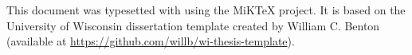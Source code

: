 This document was typesetted with \LaTeXe using the MiKTeX project. It is based on the University of Wisconsin dissertation template created by William C. Benton (available at \url{https://github.com/willb/wi-thesis-template}).
